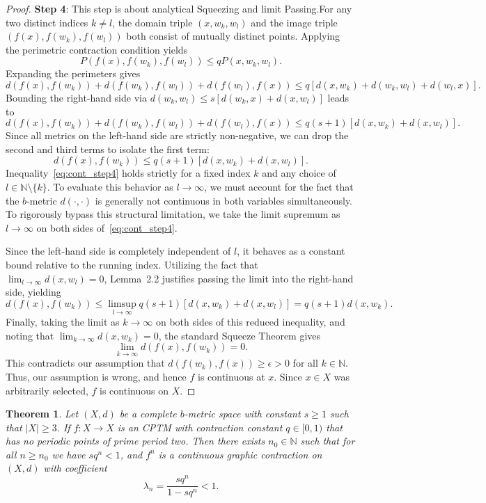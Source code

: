 \documentclass[a4paper,12pt,oneside]{article}
\newtheorem{theorem}{Theorem}[section]
\numberwithin{equation}{section}
\begin{document}
\begin{proof}
\textbf{Step 4}: This step is about analytical Squeezing and limit Passing.\newline For any two distinct indices $k \neq l$, the domain triple $(x, w_k, w_l)$ and the image triple $(f(x), f(w_k), f(w_l))$ both consist of mutually distinct points. Applying the perimetric contraction condition yields
\[
P(f(x),f(w_k),f(w_l))\leq qP(x,w_k,w_l).
\]
Expanding the perimeters gives
\[
d(f(x),f(w_k)) + d(f(w_k),f(w_l)) + d(f(w_l),f(x))\leq q[d(x,w_k) + d(w_k,w_l) + d(w_l,x)].
\]
Bounding the right-hand side via $d(w_k, w_l) \leq s[d(w_k, x) + d(x, w_l)]$ leads to
\[
d(f(x),f(w_k)) + d(f(w_k),f(w_l)) + d(f(w_l),f(x))\leq q(s + 1)[d(x,w_k) + d(x,w_l)].
\]
Since all metrics on the left-hand side are strictly non-negative, we can drop the second and third terms to isolate the first term:
\begin{equation}
d(f(x),f(w_k))\leq q(s + 1)[d(x,w_k) + d(x,w_l)].
\label{eq:cont_step4}
\end{equation}
Inequality~\eqref{eq:cont_step4} holds strictly for a fixed index $k$ and any choice of $l \in \mathbb{N} \setminus \{k\}$. To evaluate this behavior as $l \to \infty$, we must account for the fact that the $b$-metric $d(\cdot, \cdot)$ is generally not continuous in both variables simultaneously. To rigorously bypass this structural limitation, we take the limit supremum as $l \to \infty$ on both sides of~\eqref{eq:cont_step4}. 

Since the left-hand side is completely independent of $l$, it behaves as a constant bound relative to the running index. Utilizing the fact that $\lim_{l \to \infty} d(x, w_l) = 0$, Lemma~2.2 justifies passing the limit into the right-hand side, yielding
\[
d(f(x), f(w_k)) \le \limsup_{l \to \infty} q(s + 1) \left[ d(x, w_k) + d(x, w_l) \right] = q(s + 1) d(x, w_k).
\]
Finally, taking the limit as $k \to \infty$ on both sides of this reduced inequality, and noting that $\lim_{k \to \infty} d(x, w_k) = 0$, the standard Squeeze Theorem gives 
\[
\lim_{k \to \infty} d(f(x), f(w_k)) = 0.
\]
This contradicts our  assumption that $d(f(w_k), f(x)) \ge \epsilon > 0$ for all $k \in \mathbb{N}$. Thus, our assumption is wrong, and hence $f$ is continuous at $x$. Since $x \in X$ was arbitrarily selected, $f$ is continuous on $X$.
\end{proof}

\begin{theorem}
\label{thm:main_nonperiodic}
Let $(X,d)$ be a complete $b$-metric space with constant $s\geq 1$ such that $|X|\geq 3$. If $f:X\to X$ is an CPTM with contraction constant $q\in [0,1)$ that has no periodic points of prime period two. Then there exists $n_0\in \mathbb{N}$ such that for all $n\geq n_0$ we have $sq^n< 1$, and $f^n$ is a continuous graphic contraction on $(X,d)$ with coefficient
\begin{equation}
\lambda_{n} = \frac{sq^{n}}{1 - sq^{n}} < 1.
\label{eq:lambda_n}
\end{equation}
\end{theorem}
\end{document}
